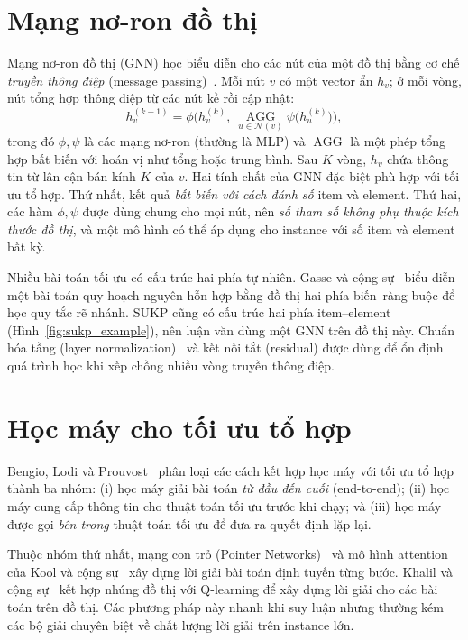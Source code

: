 \section{Mạng nơ-ron đồ thị}\label{sec:gnn}

Mạng nơ-ron đồ thị (GNN) học biểu diễn cho các nút của một đồ thị bằng cơ chế \emph{truyền thông điệp} (message passing)~\cite{Gilmer2017}. Mỗi nút $v$ có một vector ẩn $h_v$; ở mỗi vòng, nút tổng hợp thông điệp từ các nút kề rồi cập nhật:
\begin{equation}
h_v^{(k+1)}=\phi\Big(h_v^{(k)},\ \operatorname*{AGG}_{u\in\mathcal{N}(v)}\psi\big(h_u^{(k)}\big)\Big),
\end{equation}
trong đó $\phi,\psi$ là các mạng nơ-ron (thường là MLP) và $\operatorname{AGG}$ là một phép tổng hợp bất biến với hoán vị như tổng hoặc trung bình. Sau $K$ vòng, $h_v$ chứa thông tin từ lân cận bán kính $K$ của $v$. Hai tính chất của GNN đặc biệt phù hợp với tối ưu tổ hợp. Thứ nhất, kết quả \emph{bất biến với cách đánh số} item và element. Thứ hai, các hàm $\phi,\psi$ được dùng chung cho mọi nút, nên \emph{số tham số không phụ thuộc kích thước đồ thị}, và một mô hình có thể áp dụng cho instance với số item và element bất kỳ.

Nhiều bài toán tối ưu có cấu trúc hai phía tự nhiên. Gasse và cộng sự~\cite{Gasse2019} biểu diễn một bài toán quy hoạch nguyên hỗn hợp bằng đồ thị hai phía biến--ràng buộc để học quy tắc rẽ nhánh. SUKP cũng có cấu trúc hai phía item--element (Hình~\ref{fig:sukp_example}), nên luận văn dùng một GNN trên đồ thị này. Chuẩn hóa tầng (layer normalization)~\cite{Ba2016} và kết nối tắt (residual) được dùng để ổn định quá trình học khi xếp chồng nhiều vòng truyền thông điệp.

\section{Học máy cho tối ưu tổ hợp}\label{sec:ml4co}

Bengio, Lodi và Prouvost~\cite{Bengio2021} phân loại các cách kết hợp học máy với tối ưu tổ hợp thành ba nhóm: (i) học máy giải bài toán \emph{từ đầu đến cuối} (end-to-end); (ii) học máy cung cấp thông tin cho thuật toán tối ưu trước khi chạy; và (iii) học máy được gọi \emph{bên trong} thuật toán tối ưu để đưa ra quyết định lặp lại.

Thuộc nhóm thứ nhất, mạng con trỏ (Pointer Networks)~\cite{Vinyals2015} và mô hình attention của Kool và cộng sự~\cite{Kool2019} xây dựng lời giải bài toán định tuyến từng bước. Khalil và cộng sự~\cite{Khalil2017} kết hợp nhúng đồ thị với Q-learning để xây dựng lời giải cho các bài toán trên đồ thị. Các phương pháp này nhanh khi suy luận nhưng thường kém các bộ giải chuyên biệt về chất lượng lời giải trên instance lớn.

